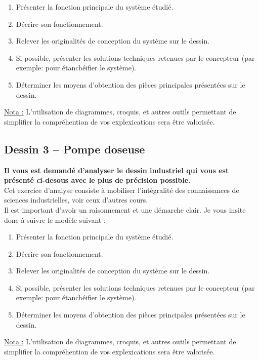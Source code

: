 \begin{enumerate}
\item Présenter la fonction principale du système étudié.
\item Décrire son fonctionnement.
\item Relever les originalités de conception du système sur le dessin.
\item Si possible, présenter les solutions techniques retenues par le concepteur (par exemple: pour étanchéifier le système).
\item Déterminer les moyens d'obtention des pièces principales présentées sur le dessin.
\end{enumerate}

\underline{Nota :} L'utilisation de diagrammes, croquis, et autres outils permettant de simplifier la compréhention de vos explexications sera être valorisée.



\subsection{Dessin 3 -- Pompe doseuse}
\textbf{Il vous est demandé d'analyser le dessin industriel qui vous est présenté ci-desous avec le plus de précision possible.}\\
Cet exercice d'analyse consiste à mobiliser l'intégralité des connaissances de sciences industrielles, voir ceux d'autres cours.\\
Il est important d'avoir un raisonnement et une démarche clair. Je vous insite donc à suivre le modèle suivant :

\begin{enumerate}
\item Présenter la fonction principale du système étudié.
\item Décrire son fonctionnement.
\item Relever les originalités de conception du système sur le dessin.
\item Si possible, présenter les solutions techniques retenues par le concepteur (par exemple: pour étanchéifier le système).
\item Déterminer les moyens d'obtention des pièces principales présentées sur le dessin.
\end{enumerate}

\underline{Nota :} L'utilisation de diagrammes, croquis, et autres outils permettant de simplifier la compréhention de vos explexications sera être valorisée.

